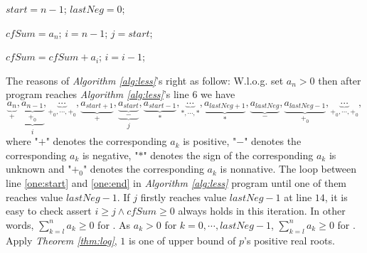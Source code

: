 \begin{algorithm}
	\caption{\less \label{alg:less}}
	\DontPrintSemicolon
	
	$start=n-1$;
	$lastNeg=0$;\;
	
	
	$cfSum=a_n$;
	$i=n-1$;
	$j=start$;\;
	{
		{
			
			$cfSum=cfSum+a_i$;
			$i=i-1$;\;
			
		}
}

\end{algorithm}
The reasons of {\em Algorithm \ref{alg:less}}'s right as follow: 
W.l.o.g. set $a_n>0$ then after program reaches {\em Algorithm \ref{alg:less}}'s line $6$ we have \[\underbrace{a_n}_{+},\underbrace{\underbrace{a_{n-1}}_{+_0}}_{i},\underbrace{\cdots}_{+_0,\cdots,+_0},\underbrace{a_{start+1}}_{+},\underbrace{\underbrace{a_{start}}_{-}}_{j},\underbrace{a_{start-1}}_{*},\underbrace{\cdots}_{*,\cdots,*},\underbrace{a_{lastNeg+1}}_{*},\underbrace{a_{lastNeg}}_{-},\underbrace{a_{lastNeg-1}}_{+_0},\underbrace{\cdots}_{+_0,\cdots,+_0},\]
where "$+$" denotes the corresponding $a_k$ is positive, "$-$" denotes the corresponding $a_k$ is negative, "$*$" denotes the sign of the
corresponding $a_k$ is unknown and  "$+_0$" denotes the corresponding $a_k$ is nonnative. 
The loop between line \ref{one:start} and \ref{one:end}  in {\em Algorithm \ref{alg:less}} program   until one of them reaches value $lastNeg-1$. If $j$ firstly  reaches value $lastNeg-1$ at line $14$,  it is easy to check assert $i\ge j\wedge cfSum\ge 0$ always holds in this iteration. In other words, $\sum_{k=l}^na_k\ge 0$ for . As $a_{k}>0$ for $k=0,\cdots, lastNeg-1$, $\sum_{k=l}^na_k\ge 0$ for . Apply {\em Theorem  \ref{thm:log}},  $1$ is one of upper bound  of $p$'s positive real roots.



